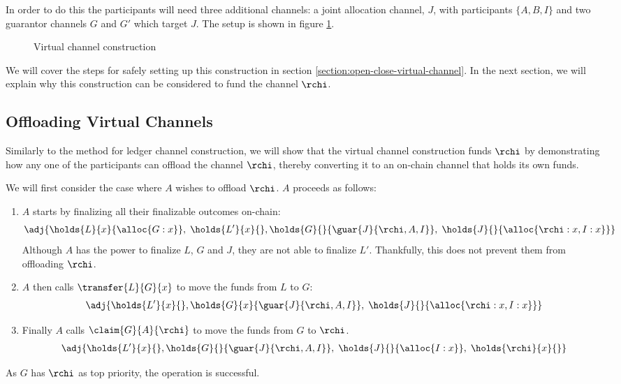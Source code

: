 In order to do this the participants will need three additional channels: a joint allocation channel, $J$, with participants $\{A, B, I\}$ and two guarantor channels $G$ and $G'$ which target $J$. The setup is shown in figure \ref{fig:virtual-channel-construction}.

\begin{figure}[ht]
  \centering
  
  \caption{Virtual channel construction}
  \label{fig:virtual-channel-construction}
\end{figure}

We will cover the steps for safely setting up this construction in section \ref{section:open-close-virtual-channel}. 
In the next section, we will explain why this construction can be considered to fund the channel $\rchi$.

\subsection{Offloading Virtual Channels}

Similarly to the method for ledger channel construction, we will show that the virtual channel construction funds $\rchi$ by demonstrating how any one of the participants can offload the channel $\rchi$, thereby converting it to an on-chain channel that holds its own funds.

We will first consider the case where $A$ wishes to offload $\rchi$. $A$ proceeds as follows:
\begin{enumerate}
  \item $A$ starts by finalizing all their finalizable outcomes on-chain:
  \begin{align}
    \adj{\holds{L}{x}{\alloc{G:x}}, \; \holds{L'}{x}{}, \holds{G}{}{\guar{J}{\rchi, A, I}}, \; \holds{J}{}{\alloc{\rchi: x, I: x}}}
  \end{align}
  Although $A$ has the power to finalize $L$, $G$ and $J$, they are not able to finalize $L'$.
  Thankfully, this does not prevent them from offloading $\rchi$.
  \item $A$ then calls $\transfer{L}{G}{x}$ to move the funds from $L$ to $G$:
  \begin{align}
    \adj{\holds{L'}{x}{}, \holds{G}{x}{\guar{J}{\rchi, A, I}}, \; \holds{J}{}{\alloc{\rchi: x, I: x}}}
  \end{align}
  \item Finally $A$ calls $\claim{G}{A}{\rchi}$ to move the funds from $G$ to $\rchi$.
  \begin{align}
    \adj{\holds{L'}{x}{}, \holds{G}{}{\guar{J}{\rchi, A, I}}, \; \holds{J}{}{\alloc{I: x}}, \; \holds{\rchi}{x}{}}
  \end{align}
\end{enumerate}
As $G$ has $\rchi$ as top priority, the operation is successful.

